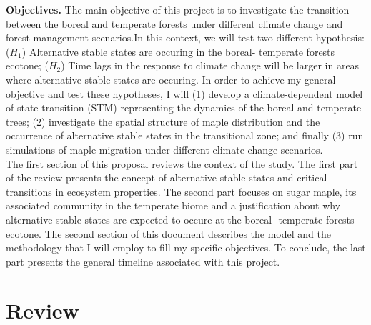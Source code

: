 

\textbf{Objectives.} The main objective of this project is to investigate the
transition  between the boreal and temperate forests under different climate
change and forest management scenarios.In this context, we will test two
different hypothesis: ($H_1$) Alternative stable states are occuring in the
boreal- temperate forests ecotone;  ($H_2$) Time lags in the response to
climate change will be larger in areas where alternative stable states are
occuring. In order to achieve my general objective and test these hypotheses,
I will (1) develop a climate-dependent model of state transition (STM)
representing the dynamics of the boreal and temperate trees; (2) investigate
the spatial structure of maple distribution and the occurrence of alternative
stable states in the transitional zone; and finally (3) run simulations of
maple migration under different climate change scenarios. \\

The first section of this proposal reviews the context of the study. The first
part of the review presents the concept of alternative stable states and
critical transitions in ecosystem properties. The second part focuses on sugar
maple, its associated community in the temperate biome and a justification
about why alternative stable states are expected to occure at the boreal-
temperate forests ecotone. The second section of this document describes the
model and the methodology that I will employ to fill my specific  objectives.
To conclude, the last part presents the general timeline associated with this
project.

\section{Review} 

